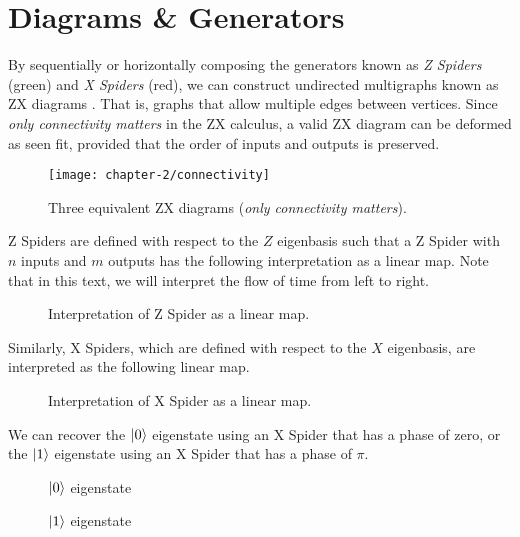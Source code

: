 \section{Diagrams \& Generators}

By sequentially or horizontally composing the generators known as \textit{Z Spiders} (green) and \textit{X Spiders} (red), we can construct undirected multigraphs known as ZX diagrams \cite{Wetering2020}. That is, graphs that allow multiple edges between vertices. Since \textit{only connectivity matters} in the ZX calculus, a valid ZX diagram can be deformed as seen fit, provided that the order of inputs and outputs is preserved.
\begin{figure}[H]
\centering
    \centering
    \texttt{[image: chapter-2/connectivity]}
    \caption{Three equivalent ZX diagrams (\textit{only connectivity matters}).}
\end{figure}

Z Spiders are defined with respect to the $Z$ eigenbasis such that a Z Spider with $n$ inputs and $m$ outputs has the following interpretation as a linear map. Note that in this text, we will interpret the flow of time from left to right.
\begin{figure}[H]
\centering
{}
\caption{Interpretation of Z Spider as a linear map.}
\end{figure}
Similarly, X Spiders, which are defined with respect to the $X$ eigenbasis, are interpreted as the following linear map.
\begin{figure}[H]
\centering
{}
\caption{Interpretation of X Spider as a linear map.}
\end{figure}

We can recover the $\ket 0$ eigenstate using an X Spider that has a phase of zero, or the $\ket 1$ eigenstate using an X Spider that has a phase of $\pi$.
\begin{figure}[H]
\centering
\begin{minipage}{.4\textwidth}
    \centering
    \caption{$\ket 0$ eigenstate}
\end{minipage}%
\begin{minipage}{.4\textwidth}
    \centering
    \caption{$\ket 1$ eigenstate}
\end{minipage}
\end{figure}


